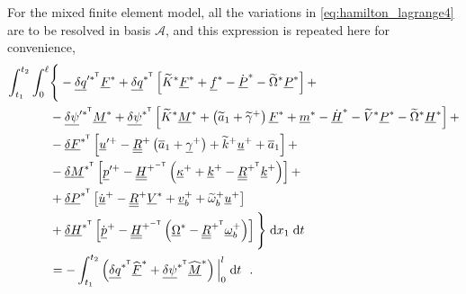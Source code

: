 \documentclass[12pt,a4paper,oneside,english]{abntex2} %
\newcommand{\vect}[1]{\underline{#1}}
\newcommand{\uvec}[1]{\overline{#1}}
\def\tens#1{\underline{\underline{#1}}}
\def\til#1{\widetilde{#1}}
\def\lb{\left[}
\def\rb{\right]}
\def\lp{\left(}
\def\rp{\right)}
\def\T{\mathsf{T}}
\def\A{\mathcal{A}}
\def\xo{x_1}
\def\aone{\uvec{a}_1}
\def\aonetil{\til{a}_1}
\def\R{\tens{R}}
\def\Rp{\R^+}
\def\RpT{\R^{+^\T}}
\def\u{\vect{u}}
\def\uplus{\u^{+}}
\def\updot{\dot{\u}^{+}}
\def\upprime{\u^{\prime+}}
\def\vb{\vect{v}_b}
\def\vbplus{\vb^{+}}
\def\om{\vect{\omega}_b}
\def\omp{\om^{+}}
\def\omtil{\til{\omega}_b}
\def\omtilp{\omtil^{+}}
\def\gam{\vect{\gamma}}
\def\gamp{\gam^{+}}
\def\gamptil{\til{\gamma}^{+}}
\def\kap{\vect{\kappa}}
\def\kapp{\kap^{+}}
\def\k{\vect{k}}
\def\kp{\k^{+}}
\def\ktil{\til{k}}
\def\ktilp{\ktil^{+}}
\def\Ktil{\til{K}}
\def\Ktils{\Ktil^{*}}
\def\V{\vect{V}}
\def\Vs{\V^{*}}
\def\Vtils{\til{V}^{*}}
\def\Om{\vect{\Omega}}
\def\Oms{\Om^{*}}
\def\Omtil{\til{\Omega}}
\def\Omtils{\Omtil^{*}}
\def\P{\vect{P}}
\def\Ps{\P^*}
\def\Pdots{\dot{\P}^*}
\def\Hv{\vect{H}}
\def\Hvdot{\dot{\Hv}}
\def\Hvs{\Hv^*}
\def\Hvdots{\Hvdot^*}
\def\H{\tens{H}}
\def\HpmT{\H^{+^{-\T}}}
\def\p{\vect{p}}
\def\pdot{\dot{\p}}
\def\ppdot{\pdot^{+}}
\def\ppprime{\p^{\prime{+}}}
\def\F{\vect{F}}
\def\Fhat{\widehat{\F}}
\def\Fhats{\Fhat^*}
\def\Fs{\F^*}
\def\M{\vect{M}}
\def\Mhat{\widehat{\M}}
\def\Mhats{\Mhat^*}
\def\Ms{\M^*}
\def\f{\vect{f}}
\def\fs{\f^*}
\def\m{\vect{m}}
\def\ms{\m^*}
\def\delF{\vect{\delta F}}
\def\delM{\vect{\delta M}}
\def\delP{\vect{\delta P}}
\def\delH{\vect{\delta H}}
\def\delFsT{\delF^{*^\T}}
\def\delMsT{\delM^{*^\T}}
\def\delPsT{\delP^{*^\T}}
\def\delHsT{\delH^{*^\T}}
\def\delq{\vect{\delta q}}
\def\delqsT{\delq^{*^\T}}
\def\delqpsT{\delq^{{\prime*}^\T}}
\def\delpsi{\vect{\delta\psi}}
\def\delpsisT{\delpsi^{*^\T}}
\def\delpsipsT{\delpsi^{\prime*^\T}}
\def\intt{\int_{t_1}^{t_2}}
\def\intl{\int_{0}^{\ell}}
\def\d{\textnormal{d}}
\begin{document}
\begin{apendicesenv}
For the mixed finite element model, all the variations in \cref{eq:hamilton_lagrange4} are to be resolved in basis $\A$, and this expression is repeated here for convenience,
\begin{align}
    \intt\intl &\Biggl\{\Biggr. -\delqpsT\Fs + \delqsT\lb\Ktils\Fs+\fs-\Pdots-\Omtils\Ps\rb +
    \nonumber \\
    & -\delpsipsT\Ms + \delpsisT\lb\Ktils\Ms+\lp\aonetil+\gamptil\rp\Fs+\ms-\Hvdots-\Vtils\Ps-\Omtils\Hvs\rb + 
    \nonumber \\
    & -\delFsT\lb\upprime-\Rp\lp\aone+\gamp\rp+\ktilp\uplus+\aone\rb + \nonumber \\
    & 
    -\delMsT\lb\ppprime-\HpmT\lp\kapp+\kp-\RpT\kp\rp\rb +
    \nonumber \\
    & +\delPsT\lb\updot-\Rp\Vs+\vbplus+\omtilp\uplus\rb 
    \nonumber \\
    & + \delHsT\lb\ppdot-\HpmT\lp\Oms-\RpT\omp\rp\rb
    \Biggl.\Biggr\}\;\d \xo\;\d t 
    \nonumber \\
    &= -\intt\lp  \delqsT\Fhats + \delpsisT\Mhats \rp\Big|_{0}^{l} \; \d t \ \ .
    \label{eq:hamilton_lagrange4_appendix}
\end{align}


\end{apendicesenv}
\end{document}
